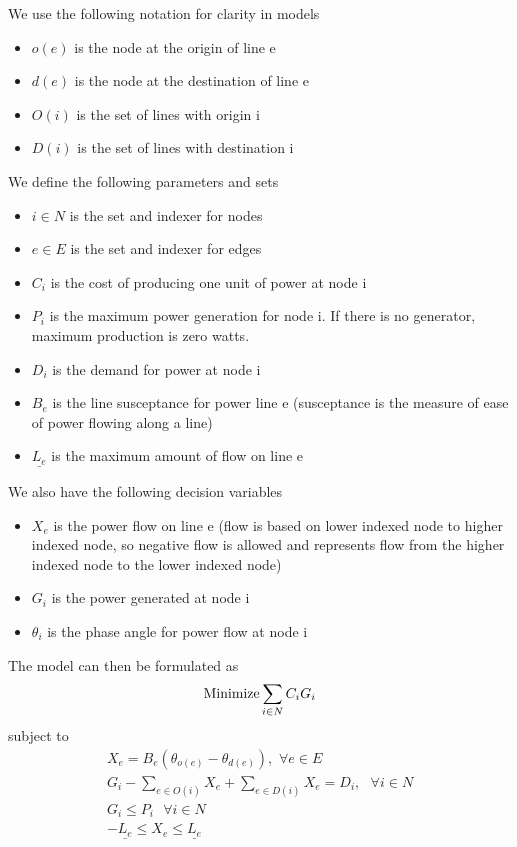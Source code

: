 \documentclass{article}
\begin{document}
		
		We use the following notation for clarity in models
	\begin{itemize}
		\item $o(e)$ is the node at the origin of line e
		\item $d(e)$ is the node at the destination of line e
		\item $O(i)$ is the set of lines with origin i
		\item $D(i)$ is the set of lines with destination i
	\end{itemize}
	We define the following parameters and sets
	\begin{itemize}
		\item $i \in N$ is the set and indexer for nodes
		\item $e \in E$ is the set and indexer for edges
		\item $C_i$ is the cost of producing one unit of power at node i
		\item $P_i$ is the maximum power generation for node i. If there is no generator, maximum production is zero watts.
		\item $D_i$ is the demand for power at node i
		\item $B_e$ is the line susceptance for power line e (susceptance is the measure of ease of power flowing along a line)
		\item $\underline{L_e}$ is the maximum amount of flow on line e
	
	\end{itemize}
	We also have the following decision variables
	\begin{itemize}
	\item $X_e$ is the power flow on line e (flow is based on lower indexed node to higher indexed node, so negative flow is allowed and represents flow from the higher indexed node to the lower indexed node)
	\item $G_i$ is the power generated at node i
	\item $\theta_i$ is the phase angle for power flow at node i 
	\end{itemize}
	The model can then be formulated as 
	\begin{equation}
\textnormal{Minimize} \sum_{i\in N} C_i G_i
	\end{equation} 
	subject to
	\begin{eqnarray}
	X_e = B_e (\theta_{o(e)} - \theta_{d(e)}), \hspace{4pt} \forall e \in E\\
	G_i - \sum_{e \in O(i)} X_e + \sum_{e \in D(i)} X_e = D_i, \hspace{4pt} \hspace{4pt} \forall i \in N\\
	  G_i \leq P_{i} \hspace{4pt} \hspace{4pt} \forall i \in N	\\ 
	  -\underline{L_e} \leq X_e \leq \underline{L_e}
\end{eqnarray}
\end{document}
